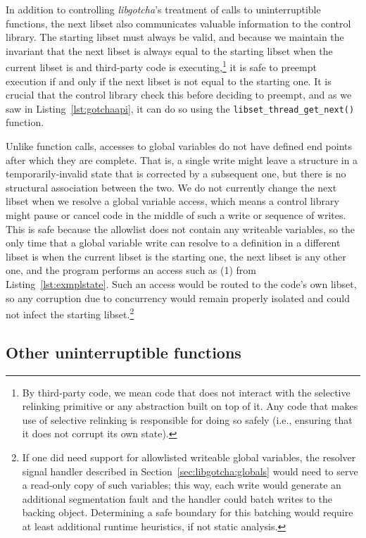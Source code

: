 In addition to controlling \textit{libgotcha}'s treatment of calls to uninterruptible
functions, the next libset also communicates valuable information to the control
library.  The starting libset must always be valid, and because we maintain the
invariant that the next libset is always equal to the starting libset when the
current libset is and third-party code is executing,\footnote{By third-party code, we
mean code that does not interact with the selective relinking primitive or any
abstraction built on top of it.  Any code that makes use of selective relinking is
responsible for doing so safely (i.e., ensuring that it does not corrupt its own
state).} it is safe to preempt execution if and only if the next libset
is not equal to the starting one.  It is crucial that the control library check this
before deciding to preempt, and as we saw in Listing~\ref{lst:gotchaapi}, it can do
so using the \texttt{libset\_thread\_get\_next()} function.

Unlike function calls, accesses to global variables do not have defined end points
after which they are complete.  That is, a single write might leave a structure in a
temporarily-invalid state that is corrected by a subsequent one, but there is no
structural association between the two.  We do not currently change the next libset
when we resolve a global variable access, which means a control library might pause
or cancel code in the middle of such a write or sequence of writes.  This is safe
because the allowlist does not contain any writeable variables, so the only time that
a global variable write can resolve to a definition in a different libset is when the
current libset is the starting one, the next libset is any other one, and the program
performs an access such as (1) from Listing~\ref{lst:exmplstate}.  Such an access
would be routed to the code's own libset, so any corruption due to concurrency would
remain properly isolated and could not infect the starting libset.\footnote{If one
did need support for allowlisted writeable global variables, the resolver signal
handler described in Section~\ref{sec:libgotcha:globals} would need to serve a
read-only copy of such variables; this way, each write would generate an additional
segmentation fault and the handler could batch writes to the backing object.
Determining a safe boundary for this batching would require at least additional
runtime heuristics, if not static analysis.}


\subsection{Other uninterruptible functions}
\label{sec:libgotcha:unintfuns}

